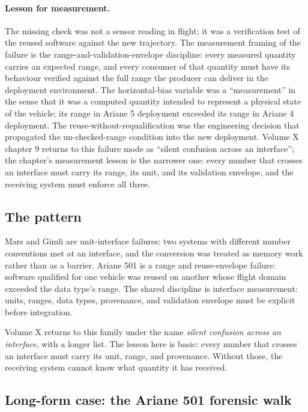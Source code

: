 \paragraph{Lesson for measurement.} The missing check was not a
sensor reading in flight; it was a verification test of the
reused software against the new trajectory. The measurement
framing of the failure is the range-and-validation-envelope
discipline: every measured quantity carries an expected range,
and every consumer of that quantity must have its behaviour
verified against the full range the producer can deliver in the
deployment environment. The horizontal-bias variable was a
``measurement'' in the sense that it was a computed quantity
intended to represent a physical state of the vehicle; its range
in Ariane 5 deployment exceeded its range in Ariane 4 deployment.
The reuse-without-requalification was the engineering decision
that propagated the un-checked-range condition into the new
deployment. Volume X chapter 9 returns to this failure mode as
``silent confusion across an interface''; the chapter's measurement
lesson is the narrower one: every number that crosses an interface
must carry its range, its unit, and its validation envelope, and
the receiving system must enforce all three.

\subsection{The pattern}

Mars and Gimli are unit-interface failures: two systems with
different number conventions met at an interface, and the conversion
was treated as memory work rather than as a barrier. Ariane 501 is a
range and reuse-envelope failure: software qualified for one vehicle
was reused on another whose flight domain exceeded the data type's
range. The shared discipline is interface measurement: units, ranges,
data types, provenance, and validation envelope must be explicit
before integration.

Volume X returns to this family under the name \emph{silent confusion
across an interface}, with a longer list. The lesson here is basic:
every number that crosses an interface must carry its unit, range,
and provenance. Without those, the receiving system cannot know what
quantity it has received.

\subsection{Long-form case: the Ariane 501 forensic walk}

